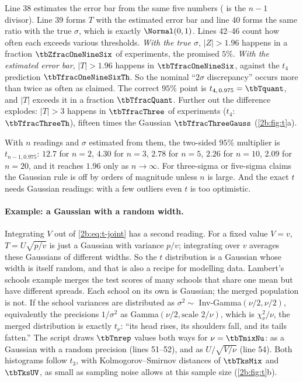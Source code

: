 
Line 38 estimates the error bar from the same five numbers ( is the $n-1$ divisor). Line 39 forms $T$ with the estimated error bar and line 40 forms the same ratio with the true $\sigma$, which is exactly $\Normal(0,1)$. Lines 42--46 count how often each exceeds various thresholds. \emph{With the true $\sigma$}, $|Z|>1.96$ happens in a fraction $\tbZfracOneNineSix$ of experiments, the promised $5\%$. \emph{With the estimated error bar}, $|T|>1.96$ happens in $\tbTfracOneNineSix$, against the $t_4$ prediction $\tbTfracOneNineSixTh$. So the nominal ``$2\sigma$ discrepancy'' occurs more than twice as often as claimed. The correct $95\%$ point is $t_{4,\,0.975}=\tbTquant$, and $|T|$ exceeds it in a fraction $\tbTfracQuant$. Further out the difference explodes: $|T|>3$ happens in $\tbTfracThree$ of experiments ($t_4$: $\tbTfracThreeTh$), fifteen times the Gaussian $\tbTfracThreeGauss$ (\cref{2b:fig:t}a).

\begin{pitfall}
With $n$ readings and $\sigma$ estimated from them, the two-sided $95\%$ multiplier is $t_{n-1,0.975}$: $12.7$ for $n=2$, $4.30$ for $n=3$, $2.78$ for $n=5$, $2.26$ for $n=10$, $2.09$ for $n=20$, and it reaches $1.96$ only as $n\to\infty$. For three-sigma or five-sigma claims the Gaussian rule is off by orders of magnitude unless $n$ is large. And the exact $t$ needs Gaussian readings: with a few outliers even $t$ is too optimistic.
\end{pitfall}

\paragraph{Example: a Gaussian with a random width.} Integrating $V$ out of \eqref{2b:eq:t-joint} has a second reading. For a fixed value $V=v$, $T=U\sqrt{p/v}$ is just a Gaussian with variance $p/v$; integrating over $v$ averages these Gaussians of different widths. So the $t$ distribution is a Gaussian whose width is itself random, and that is also a recipe for modelling data. Lambert's schools example  merges the test scores of many schools that share one mean but have different spreads. Each school on its own is Gaussian; the merged population is not. If the school variances are distributed as $\sigma^2\sim$ Inv-Gamma$(\nu/2,\nu/2)$, equivalently the precisions $1/\sigma^2$ as Gamma$(\nu/2,\text{scale }2/\nu)$, which is $\chi^2_\nu/\nu$, the merged distribution is exactly $t_\nu$: ``its head rises, its shoulders fall, and its tails fatten.'' The script draws $\tbTnrep$ values both ways for $\nu=\tbTmixNu$: as a Gaussian with a random precision (lines 51--52), and as $U/\sqrt{V/\nu}$ (line 54). Both histograms follow $t_3$, with Kolmogorov--Smirnov distances  of $\tbTksMix$ and $\tbTksUV$, as small as sampling noise allows at this sample size (\cref{2b:fig:t}b).

